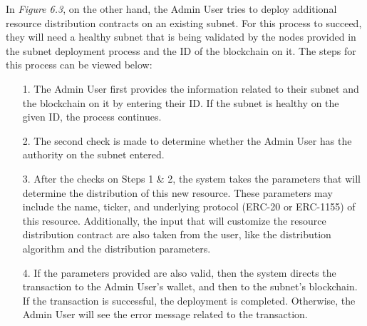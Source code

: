 \documentclass[a4paper,12pt]{report}
\begin{document}
\newpage

In \textit{Figure 6.3}, on the other hand, the Admin User tries to deploy additional resource distribution contracts on an existing subnet. For this process to succeed, they will need a healthy subnet that is being validated by the nodes provided in the subnet deployment process and the ID of the blockchain on it. The steps for this process can be viewed below:
\begin{itemize}
	\item [1.]
	The Admin User first provides the information related to their subnet and the blockchain on it by entering their ID. If the subnet is healthy on the given ID, the process continues.
	\\
	\item [2.]
	The second check is made to determine whether the Admin User has the authority on the subnet entered.
	\\
	\item [3.]
	After the checks on Steps 1 \& 2, the system takes the parameters that will determine the distribution of this new resource. These parameters may include the name, ticker, and underlying protocol (ERC-20 or ERC-1155) of this resource. Additionally, the input that will customize the resource distribution contract are also taken from the user, like the distribution algorithm and the distribution parameters.
	\\
	\item [4.]
	If the parameters provided are also valid, then the system directs the transaction to the Admin User’s wallet, and then to the subnet’s blockchain. If the transaction is successful, the deployment is completed. Otherwise, the Admin User will see the error message related to the transaction.
\end{itemize}
\end{document}
